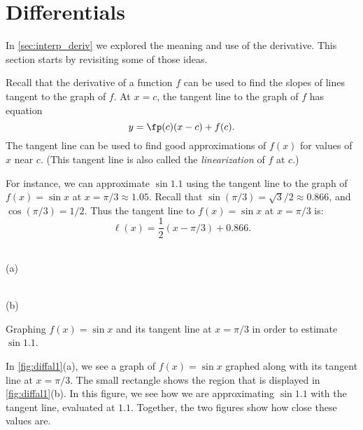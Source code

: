 \section{Differentials}\label{sec:differentials}

In \autoref{sec:interp_deriv} we explored the meaning and use of the derivative. This section starts by revisiting some of those ideas.

Recall that the derivative of a function $f$ can be used to find the slopes of lines tangent to the graph of $f$. At $x=c$, the tangent line to the graph of $f$ has equation
\[y = \fp(c)(x-c)+f(c).\]
The tangent line can be used to find good approximations of $f(x)$ for values of $x$ near $c$. (This tangent line is also called the \emph{linearization} of $f$ at $c$.)

For instance, we can approximate $\sin 1.1$ using the tangent line to the graph of $f(x)=\sin x$ at $x=\pi/3 \approx 1.05.$ Recall that $\sin (\pi/3) = \sqrt{3}/2 \approx 0.866$, and $\cos (\pi/3) = 1/2$. Thus the tangent line to $f(x) = \sin x$ at $x=\pi/3$ is: $$ \ell(x) = \frac12(x-\pi/3)+0.866.$$



{\centering
 \noindent\begin{minipage}{.45\textwidth}
  \centering
  \noindent{} \\ (a)
 \end{minipage}\quad
 \begin{minipage}{.45\textwidth}
  \centering
  \noindent{} \\ (b)
 \end{minipage}
 \caption{Graphing $f(x) = \sin x$ and its tangent line at $x=\pi/3$ in order to estimate $\sin 1.1$.}\label{fig:diffal1}}
{
}

In \autoref{fig:diffal1}(a), we see a graph of $f(x) = \sin x$ graphed along with its tangent line at $x=\pi/3$. The small rectangle shows the region that is displayed in \autoref{fig:diffal1}(b). In this figure, we see how we are approximating $\sin 1.1$ with the tangent line, evaluated at $1.1$. Together, the two figures show how close these values are.

